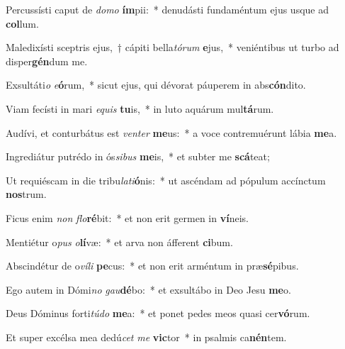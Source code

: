 \item Percussísti caput de \textit{do}\textit{mo} \textbf{ím}pii:~* denudásti fundaméntum ejus usque ad \textbf{col}lum.
\item Maledixísti sceptris ejus,~† cápiti bella\textit{tó}\textit{rum} \textbf{e}jus,~* veniéntibus ut turbo ad disper\textbf{gén}dum me.
\item Exsultáti\textit{o} \textit{e}\textbf{ó}rum,~* sicut ejus, qui dévorat páuperem in abs\textbf{cón}dito.
\item Viam fecísti in mari \textit{e}\textit{quis} \textbf{tu}is,~* in luto aquárum mul\textbf{tá}rum.
\item Audívi, et conturbátus est \textit{ven}\textit{ter} \textbf{me}us:~* a voce contremuérunt lábia \textbf{me}a.
\item Ingrediátur putrédo in ós\textit{si}\textit{bus} \textbf{me}is,~* et subter me \textbf{scá}teat;
\item Ut requiéscam in die tribu\textit{la}\textit{ti}\textbf{ó}nis:~* ut ascéndam ad pópulum accínctum \textbf{nos}trum.
\item Ficus enim \textit{non} \textit{flo}\textbf{ré}bit:~* et non erit germen in \textbf{ví}neis.
\item Mentiétur o\textit{pus} \textit{o}\textbf{lí}væ:~* et arva non áfferent \textbf{ci}bum.
\item Abscindétur de o\textit{ví}\textit{li} \textbf{pe}cus:~* et non erit arméntum in præ\textbf{sé}pibus.
\item Ego autem in Dómi\textit{no} \textit{gau}\textbf{dé}bo:~* et exsultábo in Deo Jesu \textbf{me}o.
\item Deus Dóminus forti\textit{tú}\textit{do} \textbf{me}a:~* et ponet pedes meos quasi cer\textbf{vó}rum.
\item Et super excélsa mea dedú\textit{cet} \textit{me} \textbf{vic}tor~* in psalmis ca\textbf{nén}tem.
